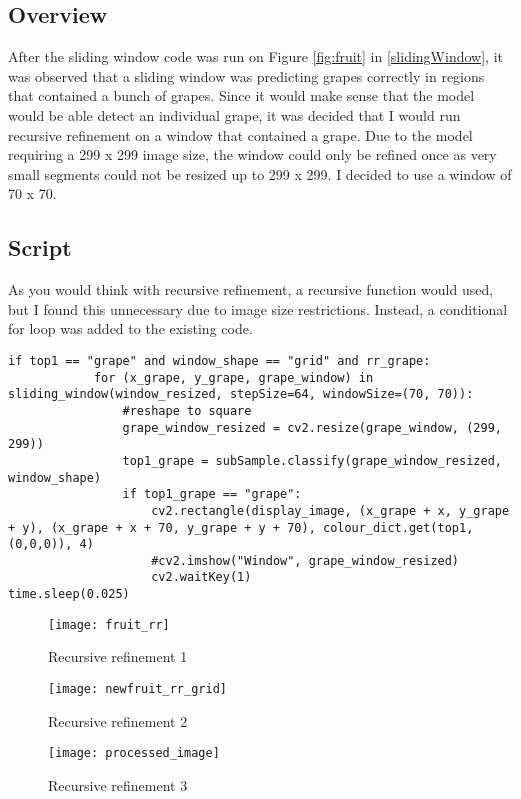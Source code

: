 \subsection*{Overview}
After the sliding window code was run on Figure \ref{fig:fruit} in \ref{slidingWindow},
it was observed that a sliding window was predicting grapes correctly in
regions that contained a bunch of grapes. Since it would make sense that the
model would be able detect an individual grape, it was decided that I would run
recursive refinement on a window that contained a grape. Due to the model
requiring a 299 x 299 image size, the window could only be refined once as
very small segments could not be resized up to 299 x 299. I decided to use a
window of 70 x 70.

\subsection*{Script}
As you would think with recursive refinement, a recursive function would used,
but I found this unnecessary due to image size restrictions. Instead, a
conditional for loop was added to the existing code.
\begin{lstlisting}
if top1 == "grape" and window_shape == "grid" and rr_grape:
			for (x_grape, y_grape, grape_window) in sliding_window(window_resized, stepSize=64, windowSize=(70, 70)):
				#reshape to square
				grape_window_resized = cv2.resize(grape_window, (299, 299))
				top1_grape = subSample.classify(grape_window_resized, window_shape)
				if top1_grape == "grape":
					cv2.rectangle(display_image, (x_grape + x, y_grape + y), (x_grape + x + 70, y_grape + y + 70), colour_dict.get(top1, (0,0,0)), 4)
					#cv2.imshow("Window", grape_window_resized)
					cv2.waitKey(1)
time.sleep(0.025)
\end{lstlisting}

\begin{figure}
    \texttt{[image: fruit\_rr]}
      \caption{Recursive refinement 1}
      \label{fig:rr1}
\end{figure}

\begin{figure}
    \texttt{[image: newfruit\_rr\_grid]}
      \caption{Recursive refinement 2}
      \label{fig:rr2}
\end{figure}

\begin{figure}
    \texttt{[image: processed\_image]}
      \caption{Recursive refinement 3}
      \label{fig:rr3}
\end{figure}


